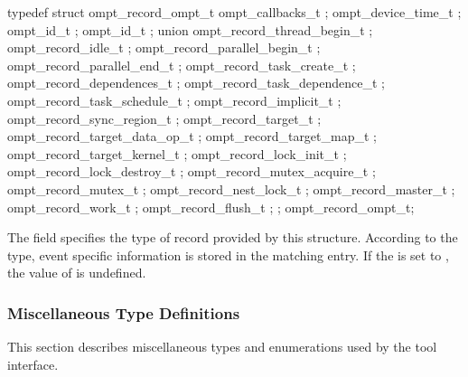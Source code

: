 \label{sec:ompt_record_ompt_t}

\begin{ccppspecific}
\begin{omptRecord}
typedef struct ompt_record_ompt_t {
  ompt_callbacks_t ;
  ompt_device_time_t ;
  ompt_id_t ;
  ompt_id_t ;
  union {
    ompt_record_thread_begin_t ;
    ompt_record_idle_t ;
    ompt_record_parallel_begin_t ;
    ompt_record_parallel_end_t ;
    ompt_record_task_create_t ;
    ompt_record_dependences_t ;
    ompt_record_task_dependence_t ;
    ompt_record_task_schedule_t ;
    ompt_record_implicit_t ;
    ompt_record_sync_region_t ;
    ompt_record_target_t ;
    ompt_record_target_data_op_t ;
    ompt_record_target_map_t ;
    ompt_record_target_kernel_t ;
    ompt_record_lock_init_t ;
    ompt_record_lock_destroy_t ;
    ompt_record_mutex_acquire_t ;
    ompt_record_mutex_t ;
    ompt_record_nest_lock_t ;
    ompt_record_master_t ;
    ompt_record_work_t ;
    ompt_record_flush_t ;
  } ;
} ompt_record_ompt_t;
\end{omptRecord}
\end{ccppspecific}


\descr
The field  specifies the type of record provided by this
structure.
According to the type, event specific information is stored in the matching
 entry.
\restrictions
If the  is set to , the value
of  is undefined.


\subsubsection{Miscellaneous Type Definitions}
\label{sec:ompt-types:misc}
This section describes miscellaneous types and enumerations used by the tool interface.

